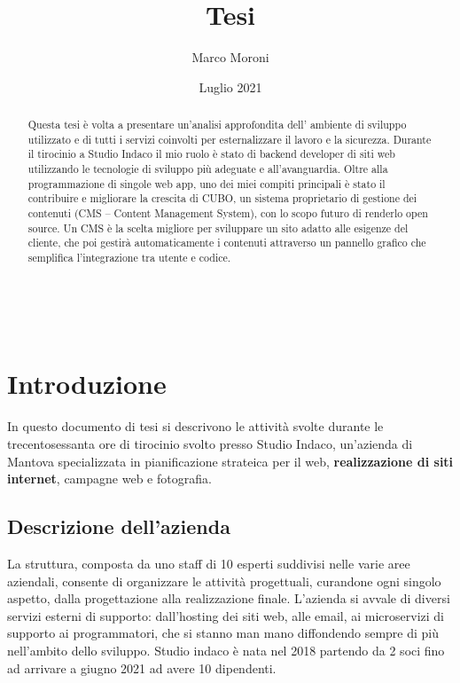 \documentclass[12pt,a4paper]{article}
\title{Tesi}
\author{Marco Moroni }
\date{Luglio 2021}
\begin{document}
\maketitle
\clearpage

\begin{abstract}
\normalsize
Questa tesi è volta a presentare un’analisi approfondita dell' ambiente di sviluppo utilizzato e di tutti i servizi coinvolti per esternalizzare il lavoro e la sicurezza.
Durante il tirocinio a Studio Indaco il mio ruolo è stato di backend developer di siti web utilizzando le tecnologie di sviluppo più adeguate e all’avanguardia.
Oltre alla programmazione di singole web app, uno dei miei compiti principali è stato il contribuire e migliorare la crescita di CUBO, un sistema proprietario di gestione dei contenuti (CMS – Content Management System), con lo scopo futuro di renderlo open source. Un CMS è la scelta migliore per sviluppare un sito adatto alle esigenze del cliente, che poi gestirà automaticamente i contenuti attraverso un pannello grafico che semplifica l'integrazione tra utente e codice.

\end{abstract}
\clearpage
\tableofcontents{}
\clearpage

\newpage
\
\newpage

\section{Introduzione}
In questo documento di tesi si descrivono le attività svolte durante le trecentosessanta ore di tirocinio svolto presso Studio Indaco, un'azienda di Mantova specializzata in pianificazione strateica per il web, \textbf{realizzazione di siti internet}, campagne web e fotografia.
\subsection{Descrizione dell'azienda}
La struttura, composta da uno staff di 10 esperti suddivisi nelle varie aree aziendali, consente di organizzare le attività progettuali, curandone ogni singolo aspetto, dalla progettazione alla realizzazione finale.
L’azienda si avvale di diversi servizi esterni di supporto: dall’hosting dei siti web, alle email, ai microservizi di supporto ai programmatori, che si stanno man mano diffondendo sempre di più nell’ambito dello sviluppo.
Studio indaco è nata nel 2018 partendo da 2 soci fino ad arrivare a giugno 2021 ad avere 10 dipendenti.
\end{document}
